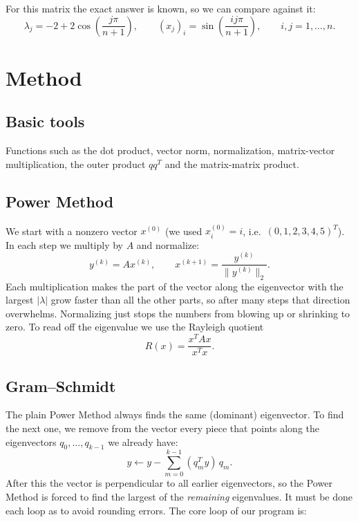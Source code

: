 \documentclass{article}
\begin{document}
For this matrix the exact answer is known, so we can compare against it:
\begin{equation}
    \lambda_j = -2 + 2\cos\!\left(\frac{j\pi}{n+1}\right), \qquad
    (x_j)_i = \sin\!\left(\frac{i j \pi}{n+1}\right), \qquad i, j = 1,\dots,n .
\end{equation}

\section{Method}

\subsection{Basic tools}
Functions such as the dot product, vector norm, normalization, matrix-vector multiplication, the outer product $q q^T$ and the matrix-matrix product.

\subsection{Power Method}
We start with a nonzero vector $x^{(0)}$ (we used $x^{(0)}_i = i$, i.e.\ $(0,1,2,3,4,5)^T$). In each step we
multiply by $A$ and normalize:
\begin{equation}
    y^{(k)} = A x^{(k)}, \qquad x^{(k+1)} = \frac{y^{(k)}}{\|y^{(k)}\|_2}.
\end{equation}
Each multiplication makes the part of the vector along the eigenvector with the largest $|\lambda|$ grow
faster than all the other parts, so after many steps that direction overwhelms. Normalizing just stops the numbers from
blowing up or shrinking to zero. To read off the eigenvalue we use the Rayleigh quotient
\begin{equation}
    R(x) = \frac{x^T A x}{x^T x}.
\end{equation}

\subsection{Gram--Schmidt}
The plain Power Method always finds the same (dominant) eigenvector. To find the next one, we remove from the
vector every piece that points along the eigenvectors $q_0, \dots, q_{k-1}$ we already have:
\begin{equation}
    y \leftarrow y - \sum_{m=0}^{k-1} (q_m^T y)\, q_m .
\end{equation}
After this the vector is perpendicular to all earlier eigenvectors, so the Power Method is forced to find the
largest of the \emph{remaining} eigenvalues. It must be done each loop as to avoid rounding errors. The core loop of our program is:
\end{document}
